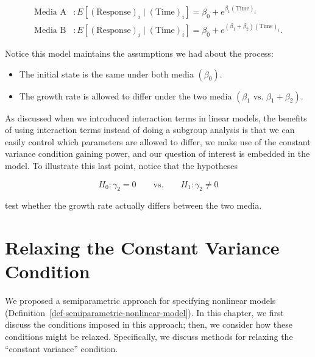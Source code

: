 \documentclass[
  letterpaper,
  DIV=11,
  numbers=noendperiod]{scrreprt}
\providecommand{\tightlist}{%
  \setlength{\itemsep}{0pt}\setlength{\parskip}{0pt}}\usepackage{longtable,booktabs,array}
\theoremstyle{definition}
\theoremstyle{definition}
\theoremstyle{remark}
\begin{document}
\[
\begin{aligned}
  \text{Media A}&: E\left[(\text{Response})_i \mid (\text{Time})_i\right] = \beta_0 + e^{\beta_1 (\text{Time})_i} \\
  \text{Media B}&: E\left[(\text{Response})_i \mid (\text{Time})_i\right] = \beta_0 + e^{\left(\beta_1 + \beta_2\right)(\text{Time})_i}.
\end{aligned}
\]

Notice this model maintains the assumptions we had about the process:

\begin{itemize}
\tightlist
\item
  The initial state is the same under both media
  \(\left(\beta_0\right)\).
\item
  The growth rate is allowed to differ under the two media
  \(\left(\beta_1 \text{ vs. } \beta_1 + \beta_2\right)\).
\end{itemize}

As discussed when we introduced interaction terms in linear models, the
benefits of using interaction terms instead of doing a subgroup analysis
is that we can easily control which parameters are allowed to differ, we
make use of the constant variance condition gaining power, and our
question of interest is embedded in the model. To illustrate this last
point, notice that the hypotheses

\[H_0: \gamma_2 = 0 \qquad \text{vs.} \qquad H_1: \gamma_2 \neq 0\]

test whether the growth rate actually differs between the two media.

\hypertarget{sec-nlm-heteroskedasticity}{%
\chapter{Relaxing the Constant Variance
Condition}\label{sec-nlm-heteroskedasticity}}

\providecommand{\norm}[1]{\left\lVert#1\right\rVert}
\providecommand{\abs}[1]{\left\lvert#1\right\rvert}
\providecommand{\dist}[1]{\stackrel{\text{#1}}{\sim}}
\providecommand{\ind}[1]{\mathbb{I}\left(#1\right)}
\providecommand{\bm}[1]{\mathbf{#1}}
\providecommand{\bs}[1]{\boldsymbol{#1}}
\providecommand{\Ell}{\mathcal{L}}
\providecommand{\indep}{\perp\negthickspace\negmedspace\perp}

We proposed a semiparametric approach for specifying nonlinear models
(Definition~\ref{def-semiparametric-nonlinear-model}). In this chapter,
we first discuss the conditions imposed in this approach; then, we
consider how these conditions might be relaxed. Specifically, we discuss
methods for relaxing the ``constant variance'' condition.
\end{document}

